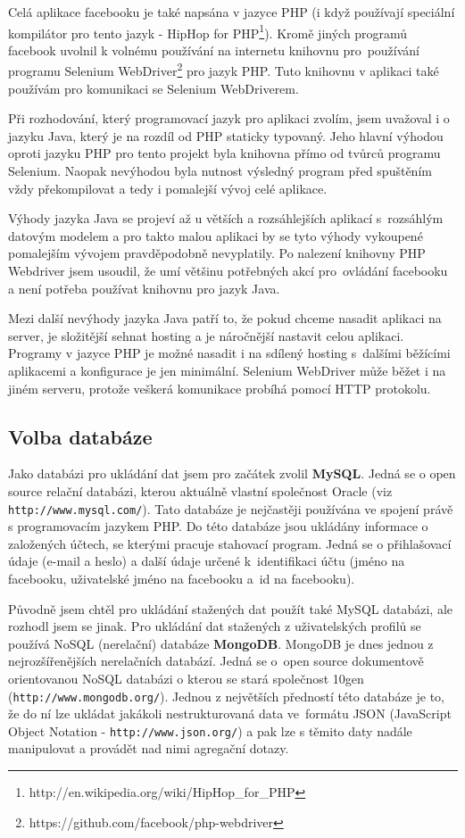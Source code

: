 \documentclass[thesis=M,czech]{FITthesis}[2013/05/10]
\begin{document}
Celá aplikace facebooku je také napsána v jazyce PHP (i když používají speciální kompilátor pro tento jazyk - HipHop for PHP\footnote{http://en.wikipedia.org/wiki/HipHop\_for\_PHP}). Kromě jiných programů facebook uvolnil k volnému používání na internetu knihovnu pro~používání programu Selenium WebDriver\footnote{https://github.com/facebook/php-webdriver} pro jazyk PHP. Tuto knihovnu v aplikaci také používám pro komunikaci se Selenium WebDriverem.

Při rozhodování, který programovací jazyk pro aplikaci zvolím, jsem uvažoval i o jazyku Java, který je na rozdíl od PHP staticky typovaný. Jeho hlavní výhodou oproti jazyku PHP pro tento projekt byla knihovna přímo od tvůrců programu Selenium. Naopak nevýhodou byla nutnost výsledný program před spuštěním vždy překompilovat a tedy i pomalejší vývoj celé aplikace. 

Výhody jazyka Java se projeví až u větších a rozsáhlejších aplikací s~rozsáhlým datovým modelem a pro takto malou aplikaci by se tyto výhody vykoupené pomalejším vývojem pravděpodobně nevyplatily. Po nalezení  knihovny PHP Webdriver jsem usoudil, že umí většinu potřebných akcí pro~ovládání facebooku a není potřeba používat knihovnu pro jazyk Java.

Mezi další nevýhody jazyka Java patří to, že pokud chceme nasadit aplikaci na server, je složitější sehnat hosting a je náročnější nastavit celou aplikaci. Programy v jazyce PHP je možné nasadit i na sdílený hosting s~dalšími běžícími aplikacemi a konfigurace je jen minimální. Selenium WebDriver může běžet i na jiném serveru, protože veškerá komunikace probíhá pomocí HTTP protokolu.

\subsection{Volba databáze}

Jako databázi pro ukládání dat jsem pro začátek zvolil \textbf{MySQL}. Jedná se o open source relační databázi, kterou aktuálně vlastní společnost Oracle (viz \verb|http://www.mysql.com/|). Tato databáze je nejčastěji používána ve spojení právě s programovacím jazykem PHP. Do této databáze jsou ukládány informace o založených účtech, se kterými pracuje stahovací program. Jedná se o přihlašovací údaje (e-mail a heslo) a další údaje určené k~identifikaci účtu (jméno na facebooku, uživatelské jméno na facebooku a~id na facebooku).

Původně jsem chtěl pro ukládání stažených dat použít také MySQL databázi, ale rozhodl jsem se jinak. Pro ukládání dat stažených z uživatelských profilů se používá NoSQL (nerelační) databáze \textbf{MongoDB}. MongoDB je dnes jednou z nejrozšířenějších nerelačních databází. Jedná se o~open source dokumentově orientovanou NoSQL databázi o kterou se stará společnost 10gen (\verb|http://www.mongodb.org/|). Jednou z největších předností této databáze je to, že do ní lze ukládat jakákoli nestrukturovaná data ve~formátu JSON (JavaScript Object Notation - \verb|http://www.json.org/|) a pak lze s těmito daty nadále manipulovat a provádět nad nimi agregační dotazy. 
\end{document}
